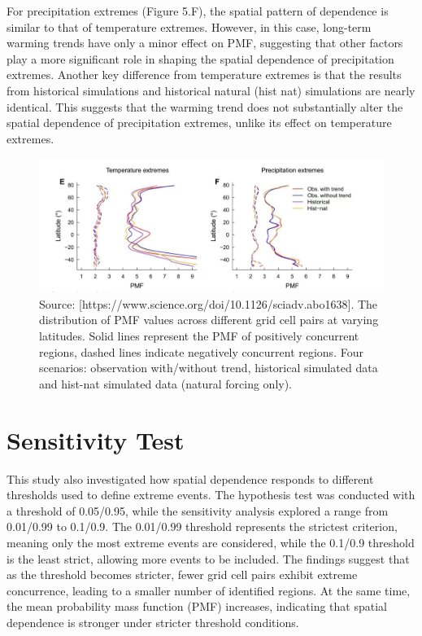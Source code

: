 \documentclass[
]{krantz}
\begin{document}
For precipitation extremes (Figure 5.F), the spatial pattern of dependence is similar to that of temperature extremes. However, in this case, long-term warming trends have only a minor effect on PMF, suggesting that other factors play a more significant role in shaping the spatial dependence of precipitation extremes. Another key difference from temperature extremes is that the results from historical simulations and historical natural (hist nat) simulations are nearly identical. This suggests that the warming trend does not substantially alter the spatial dependence of precipitation extremes, unlike its effect on temperature extremes.

\vspace{1em}
\begin{figure}

{\centering \includegraphics[width=0.8\linewidth]{work/06-anthropo/figures/latitude} 

}

\caption{Source: [https://www.science.org/doi/10.1126/sciadv.abo1638]. The distribution of PMF values across different grid cell pairs at varying latitudes. Solid lines represent the PMF of positively concurrent regions, dashed lines indicate negatively concurrent regions. Four scenarios: observation with/without trend, historical simulated data and hist-nat simulated data (natural forcing only).}\label{fig:unnamed-chunk-10}
\end{figure}
\vspace{1em}

\section{Sensitivity Test}\label{sensitivity-test}

This study also investigated how spatial dependence responds to different thresholds used to define extreme events. The hypothesis test was conducted with a threshold of 0.05/0.95, while the sensitivity analysis explored a range from 0.01/0.99 to 0.1/0.9. The 0.01/0.99 threshold represents the strictest criterion, meaning only the most extreme events are considered, while the 0.1/0.9 threshold is the least strict, allowing more events to be included. The findings suggest that as the threshold becomes stricter, fewer grid cell pairs exhibit extreme concurrence, leading to a smaller number of identified regions. At the same time, the mean probability mass function (PMF) increases, indicating that spatial dependence is stronger under stricter threshold conditions.
\end{document}
